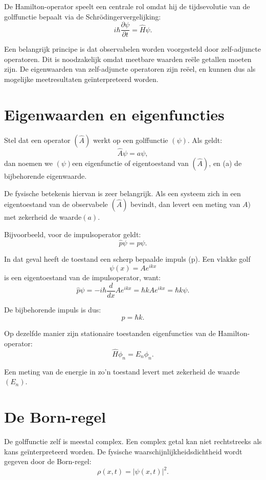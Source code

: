 \documentclass{report} %
\begin{document}
    De Hamilton-operator speelt een centrale rol omdat hij de tijdsevolutie van de golffunctie bepaalt via de Schrödingervergelijking:
    \[
        i\hbar\frac{\partial \psi}{\partial t}
        =
        \hat{H}\psi.
    \]

    Een belangrijk principe is dat observabelen worden voorgesteld door zelf-adjuncte operatoren. Dit is noodzakelijk omdat meetbare waarden reële getallen moeten zijn. De eigenwaarden van zelf-adjuncte operatoren zijn reëel, en kunnen dus als mogelijke meetresultaten geïnterpreteerd worden.


    \section{Eigenwaarden en eigenfuncties}

    Stel dat een operator $(\hat{A})$ werkt op een golffunctie $(\psi)$. Als geldt:
    \[
        \hat{A}\psi=a\psi,
    \]
    dan noemen we $(\psi) $een eigenfunctie of eigentoestand van $(\hat{A})$, en (a) de bijbehorende eigenwaarde.

    De fysische betekenis hiervan is zeer belangrijk. Als een systeem zich in een eigentoestand van de observabele $(\hat{A})$ bevindt, dan levert een meting van $A)$met zekerheid de waarde$ (a)$.

    Bijvoorbeeld, voor de impulsoperator geldt:
    \[
        \hat{p}\psi=p\psi.
    \]

    In dat geval heeft de toestand een scherp bepaalde impuls (p). Een vlakke golf
    \[
        \psi(x)=Ae^{ikx}
    \]
    is een eigentoestand van de impulsoperator, want:
    \[
        \hat{p}\psi
        =
        -i\hbar\frac{d}{dx}Ae^{ikx}
        =
        \hbar k Ae^{ikx}
        =
        \hbar k \psi.
    \]

    De bijbehorende impuls is dus:
    \[
        p=\hbar k.
    \]

    Op dezelfde manier zijn stationaire toestanden eigenfuncties van de Hamilton-operator:
    \[
        \hat{H}\phi_n=E_n\phi_n.
    \]

    Een meting van de energie in zo'n toestand levert met zekerheid de waarde $(E_n)$.


    \section{De Born-regel}

    De golffunctie zelf is meestal complex. Een complex getal kan niet rechtstreeks als kans geïnterpreteerd worden. De fysische waarschijnlijkheidsdichtheid wordt gegeven door de Born-regel:
    \[
        \rho(x,t)=|\psi(x,t)|^2.
    \]
\end{document}
